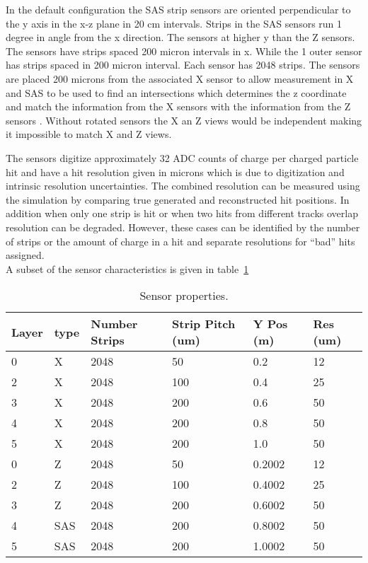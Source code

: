\documentclass[aps,prd,superscriptaddress,floatfix]{revtex4}
\begin{document}
In the default configuration the SAS strip sensors are oriented perpendicular to the y axis in
the x-z plane in 20 cm intervals.  Strips in the SAS sensors run 1 degree in angle from the x
direction.  The sensors at higher y than the Z sensors.  The  sensors have strips spaced 200 micron
intervals in x. While the 1 outer sensor has strips spaced in 200 micron
interval.  Each sensor has 2048 strips.  The sensors are placed 200 microns from the associated X sensor to allow measurement in X
and SAS to be used to find an intersections which determines the z coordinate and match the information from the X sensors with the 
information from the Z sensors .  Without rotated sensors the X an Z views would be independent making it impossible to match X and Z
views.


The sensors digitize approximately 32 ADC counts of charge per charged
particle hit and have a hit resolution given in microns which is due to
digitization and intrinsic resolution uncertainties.  The combined resolution
can be measured using the simulation by comparing true generated and reconstructed
hit positions.  In addition when only one strip is hit or when two hits from
different tracks overlap resolution can be degraded.  However, these cases can
be identified by the number of strips or the amount of charge in a hit and separate
resolutions for ``bad'' hits assigned.
\\

A subset of the sensor characteristics is given in table~\ref{tab:detectorTable}
\\

\begin{table}
\caption{\label{tab:detectorTable} Sensor properties.}
\begin{tabular}{|l|l|l|l|l|l|}
\hline 
Layer & type & Number Strips & Strip Pitch (um) & Y Pos (m) & Res (um)\\
\hline
0 & X & 2048 & 50	& 0.2 & 12	 \\
2 & X & 2048 & 100	& 0.4 & 25	 \\
3 & X & 2048 & 200	& 0.6 & 50	 \\
4 & X & 2048 & 200	& 0.8 & 50	 \\
5 & X & 2048 & 200	& 1.0 & 50	 \\
0 & Z & 2048 & 50	& 0.2002 & 12	 \\
2 & Z & 2048 & 100	& 0.4002 & 25	 \\
3 & Z & 2048 & 200	& 0.6002 & 50	 \\
4 & SAS & 2048 & 200	& 0.8002 & 50	 \\
5 & SAS & 2048 & 200	& 1.0002 & 50	 \\
\hline
\end{tabular}
\end{table}
\end{document}
